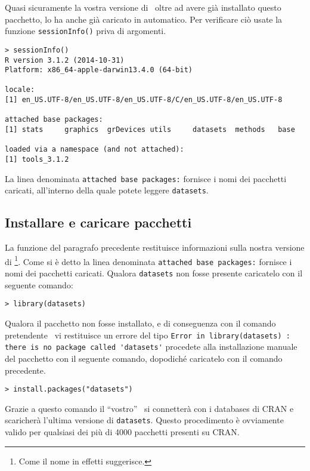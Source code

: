 Quasi sicuramente la vostra versione di \erre\ oltre ad avere già installato questo pacchetto, lo ha anche già caricato in automatico. Per verificare ciò usate la funzione \lstinline!sessionInfo()! priva di argomenti.

\begin{lstlisting}
> sessionInfo()
R version 3.1.2 (2014-10-31)
Platform: x86_64-apple-darwin13.4.0 (64-bit)

locale:
[1] en_US.UTF-8/en_US.UTF-8/en_US.UTF-8/C/en_US.UTF-8/en_US.UTF-8

attached base packages:
[1] stats     graphics  grDevices utils     datasets  methods   base     

loaded via a namespace (and not attached):
[1] tools_3.1.2
\end{lstlisting}

La linea denominata \lstinline!attached base packages:! fornisce i nomi dei pacchetti caricati, all'interno della quale potete leggere \lstinline!datasets!.

\subsection{Installare e caricare pacchetti}
La funzione del paragrafo precedente restituisce informazioni sulla nostra versione di \erre\footnote{Come il nome in effetti suggerisce.}. Come si è detto la linea denominata \lstinline!attached base packages:! fornisce i nomi dei pacchetti caricati. Qualora \lstinline!datasets! non fosse presente caricatelo con il seguente comando:

\begin{lstlisting}
> library(datasets)
\end{lstlisting}

Qualora il pacchetto non fosse installato, e di conseguenza con il comando pretendente \erre\ vi restituisce un errore del tipo \lstinline!Error in library(datasets) : there is no package called 'datasets'!  procedete alla installazione manuale del pacchetto con il seguente comando, dopodiché caricatelo con il comando precedente.

\begin{lstlisting}
> install.packages("datasets")
\end{lstlisting}

Grazie a questo comando il ``vostro'' \erre\ si connetterà con i databases di CRAN e scaricherà l'ultima versione di \lstinline!datasets!. Questo procedimento è ovviamente valido per qualsiasi dei più di 4000 pacchetti presenti su CRAN.

